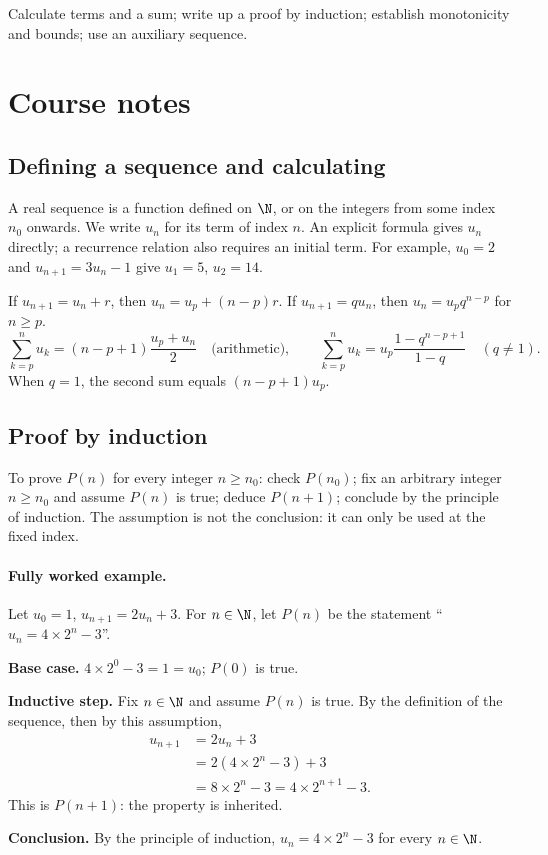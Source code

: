 \label{ch:1}


\begin{keypoint}[Objectives]Calculate terms and a sum; write up a proof by induction; establish monotonicity and bounds; use an auxiliary sequence.\end{keypoint}

\section{Course notes}
\subsection{Defining a sequence and calculating}
A real sequence is a function defined on $\N$, or on the integers from some index $n_0$ onwards. We write $u_n$ for its term of index $n$. An explicit formula gives $u_n$ directly; a recurrence relation also requires an initial term. For example, $u_0=2$ and $u_{n+1}=3u_n-1$ give $u_1=5$, $u_2=14$.
\begin{keypoint}
If $u_{n+1}=u_n+r$, then $u_n=u_p+(n-p)r$. If $u_{n+1}=qu_n$, then $u_n=u_pq^{n-p}$ for $n\ge p$.
\[\sum_{k=p}^n u_k=(n-p+1)\frac{u_p+u_n}{2}\quad\text{(arithmetic)},\qquad
\sum_{k=p}^n u_k=u_p\frac{1-q^{n-p+1}}{1-q}\quad(q\ne1).\]
When $q=1$, the second sum equals $(n-p+1)u_p$.
\end{keypoint}
\subsection{Proof by induction}
To prove $P(n)$ for every integer $n\ge n_0$: check $P(n_0)$; fix an arbitrary integer $n\ge n_0$ and assume $P(n)$ is true; deduce $P(n+1)$; conclude by the principle of induction. The assumption is not the conclusion: it can only be used at the fixed index.
\paragraph{Fully worked example.} Let $u_0=1$, $u_{n+1}=2u_n+3$. For $n\in\N$, let $P(n)$ be the statement ``$u_n=4\times2^n-3$''.
\par\smallskip\textbf{Base case.} $4\times2^0-3=1=u_0$; $P(0)$ is true.
\par\smallskip\textbf{Inductive step.} Fix $n\in\N$ and assume $P(n)$ is true. By the definition of the sequence, then by this assumption,
\[\begin{aligned}u_{n+1}&=2u_n+3\\&=2(4\times2^n-3)+3\\&=8\times2^n-3=4\times2^{n+1}-3.\end{aligned}\]
This is $P(n+1)$: the property is inherited.
\par\smallskip\textbf{Conclusion.} By the principle of induction, $u_n=4\times2^n-3$ for every $n\in\N$.
